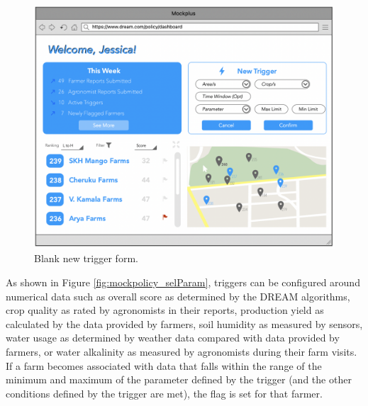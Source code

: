 \begin{figure}[H]
\centering
\includegraphics[scale=0.4]{../images_diagrams/mock_ups/dd/Trig02_SetUp.png}
\caption{\label{fig:mockpolicy_form}Blank new trigger form.}
\end{figure}

\begin{flushleft}
As shown in Figure \ref{fig:mockpolicy_selParam}, triggers can be configured around numerical data such as overall score as determined by the DREAM algorithms, crop quality as rated by agronomists in their reports, production yield as calculated by the data provided by farmers, soil humidity as measured by sensors, water usage as determined by weather data compared with data provided by farmers, or water alkalinity as measured by agronomists during their farm visits. If a farm becomes associated with data that falls within the range of the minimum and maximum of the parameter defined by the trigger (and the other conditions defined by the trigger are met), the flag is set for that farmer. 
\end{flushleft}


